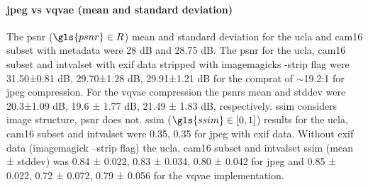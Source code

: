 \documentclass[review]{elsarticle}
\begin{document}

\paragraph{\gls{jpeg} vs \gls{vqvae} (mean and standard deviation)} The \gls{psnr} ($\gls{psnr}\in R$) mean and standard deviation for the \gls{ucla} and \gls{cam16} subset with metadata were 28 dB and 28.75 dB. The \gls{psnr} for the \gls{ucla}, \gls{cam16} subset and \gls{intvalset} with \gls{exif} data stripped with imagemagicks -strip flag were 31.50±0.81 dB, 29.70±1.28 dB, 29.91±1.21 dB for the \gls{comprat} of $\sim$19.2:1 for \gls{jpeg} compression. For the \gls{vqvae} compression the \gls{psnr}s \gls{mean} and \gls{stddev} were 20.3±1.09 dB, 19.6 ± 1.77 dB, 21.49 ± 1.83 dB, respectively. \gls{ssim} considers image structure, \gls{psnr} does not. \gls{ssim} ($\gls{ssim}\in [0,1]$) results for the \gls{ucla}, \gls{cam16} subset and \gls{intvalset} were 0.35, 0.35 for \gls{jpeg} with \gls{exif} data. Without \gls{exif} data (imagemagick –strip flag) the \gls{ucla}, \gls{cam16} subset and \gls{intvalset} \gls{ssim} (\gls{mean} ± \gls{stddev}) was 0.84 ± 0.022, 0.83 ± 0.034, 0.80 ± 0.042 for \gls{jpeg} and 0.85 ± 0.022, 0.72 ± 0.072, 0.79 ± 0.056 for the \gls{vqvae} implementation.
\end{document}
